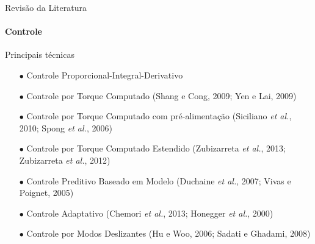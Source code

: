 \documentclass[25pt,landscape]{beamer}
\begin{document}
\begin{frame}{Revisão da Literatura}
    \framesubtitle{Controle}
    \begin{block}{Principais técnicas}
        \begin{itemize}
            \item[$\bullet$] Controle Proporcional-Integral-Derivativo \\
            \item[$\bullet$] Controle por Torque Computado (Shang e Cong, 2009; Yen e Lai, 2009) \\ %
            \item[$\bullet$] Controle por Torque Computado com pré-alimentação (Siciliano \emph{et al.}, 2010; Spong \emph{et al.}, 2006)\\  %
            \item[$\bullet$] Controle por Torque Computado Estendido (Zubizarreta \emph{et al.}, 2013; Zubizarreta \emph{et al.}, 2012) \\ %
            \item[$\bullet$] Controle Preditivo Baseado em Modelo (Duchaine \emph{et al.}, 2007; Vivas e Poignet, 2005) \\ %
            \item[$\bullet$] Controle Adaptativo (Chemori \emph{et al.}, 2013; Honegger \emph{et al.}, 2000)  \\ %
            \item[$\bullet$] Controle por Modos Deslizantes (Hu e Woo, 2006; Sadati e Ghadami, 2008)  \\ %
        \end{itemize}
    \end{block}
\end{frame}
\end{document}
